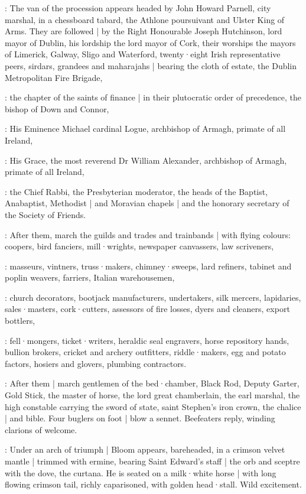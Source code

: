 :
The van of the procession appears headed by John Howard Parnell,
city marshal,
in a chessboard tabard,
the Athlone poursuivant and Ulster King of Arms.
They are followed |
by the Right Honourable Joseph Hutchinson,
lord mayor of Dublin,
his lordship the lord mayor of Cork,
their worships the mayors of Limerick,
Galway,
Sligo and Waterford,
twenty·eight Irish representative peers,
sirdars,
grandees and maharajahs |
bearing the cloth of estate,
the Dublin Metropolitan Fire Brigade,

:
the chapter of the saints of finance |
in their plutocratic order of precedence,
the bishop of Down and Connor,

:
His Eminence Michael cardinal Logue,
archbishop of Armagh,
primate of all Ireland,

:
His Grace,
the most reverend Dr William Alexander,
archbishop of Armagh,
primate of all Ireland,

:
the Chief Rabbi,
the Presbyterian moderator,
the heads of the Baptist,
Anabaptist,
Methodist |
and Moravian chapels |
and the honorary secretary of the Society of Friends.

:
After them,
march the guilds and trades and trainbands |
with flying colours:
coopers,
bird fanciers,
mill·wrights,
newspaper canvassers,
law scriveners,

:
masseurs,
vintners,
truss·makers,
chimney·sweeps,
lard refiners,
tabinet and poplin weavers,
farriers,
Italian warehousemen,

:
church decorators,
bootjack manufacturers,
undertakers,
silk mercers,
lapidaries,
sales·masters,
cork·cutters,
assessors of fire losses,
dyers and cleaners,
export bottlers,

:
fell·mongers,
ticket·writers,
heraldic seal engravers,
horse repository hands,
bullion brokers,
cricket and archery outfitters,
riddle·makers,
egg and potato factors,
hosiers and glovers,
plumbing contractors.

:
After them |
march gentlemen of the bed·chamber,
Black Rod,
Deputy Garter,
Gold Stick,
the master of horse,
the lord great chamberlain,
the earl marshal,
the high constable carrying the sword of state,
saint Stephen's iron crown,
the chalice |
and bible.
Four buglers on foot |
blow a sennet.
Beefeaters reply,
winding clarions of welcome.

:
Under an arch of triumph |
Bloom appears,
bareheaded,
in a crimson velvet mantle |
trimmed with ermine,
bearing Saint Edward's staff |
the orb and sceptre with the dove,
the curtana.
He is seated on a milk·white horse |
with long flowing crimson tail,
richly caparisoned,
with golden head·stall.
Wild excitement.


